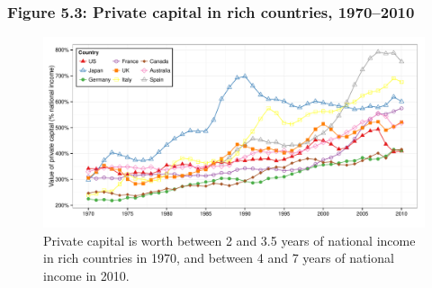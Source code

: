 \documentclass[t]{beamer}\usepackage[]{graphicx}\usepackage[]{color}
\newenvironment{knitrout}{}{} %
\begin{document}
\begin{frame}[label=Figure53]
\frametitle{Figure 5.3: Private capital in rich countries, 1970--2010}
\begin{figure}[t]
\begin{minipage}[b]{\textwidth}
\centering
\begin{knitrout}\footnotesize
{}\color{fgcolor}

{\centering \includegraphics[width=1\linewidth]{figures/color/Figure_5_3} 

}



\end{knitrout}
\caption{Private capital is worth between 2 and 3.5 years of national income in rich countries in 1970, and between 4 and 7 years of national income in 2010.}
\end{minipage}
\end{figure}
\end{frame}
\end{document}
